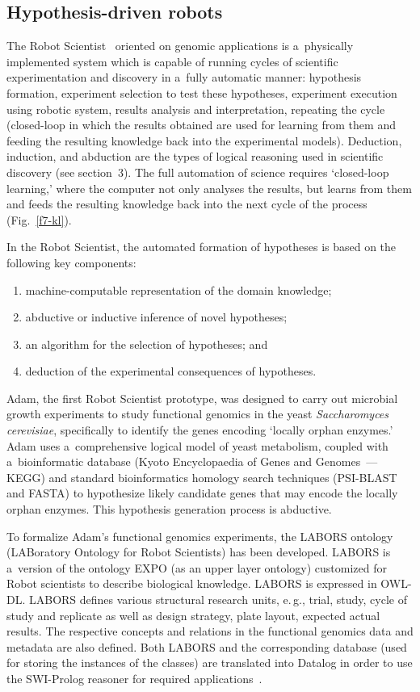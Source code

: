 \begin{multicols}{2}
\subsection{Hypothesis-driven robots}

\noindent
  The Robot Scientist~\cite{53-kl} oriented on genomic applications is a~physically
implemented system which is capable of running cycles of scientific experimentation
and discovery in a~fully automatic manner: hypothesis formation, experiment
selection to test these hypotheses, experiment execution using robotic system, results
analysis and interpretation, repeating the cycle  (closed-loop in which the results
obtained are used for learning from them and feeding the resulting knowledge back
into the experimental models). Deduction, induction, and abduction are the types of
logical reasoning used in scientific discovery (see section~3). The full automation of
science requires `closed-loop learning,' where the computer not only analyses the
results, but learns from them and feeds the resulting knowledge back into the next
cycle of the process (Fig.~\ref{f7-kl}).

  In the Robot Scientist, the automated formation of hypotheses is based on the
following key components:
  \begin{enumerate}[(1)]
\item machine-computable representation of the domain knowledge;
\item abductive or inductive inference of novel hypotheses;
\item an algorithm for the selection of hypotheses; and
\item deduction of the experimental consequences of hypotheses.
\end{enumerate}

  Adam, the first Robot Scientist prototype, was designed to carry out microbial
growth experiments to study functional genomics in the yeast \textit{Saccharomyces
cerevisiae}, specifically to identify the genes encoding `locally orphan enzymes.'
Adam uses a~comprehensive logical model of yeast metabolism, coupled with a~bioinformatic database (Kyoto Encyclopaedia of Genes and Genomes~--- KEGG)
and standard bioinformatics homology search techniques (PSI-BLAST and FASTA)
to hypothesize likely candidate genes that may encode the locally orphan enzymes.
This hypothesis generation process is abductive.

  To formalize Adam's functional genomics experiments, the LABORS ontology
(LABoratory Ontology for Robot Scientists) has been developed. LABORS is a~version of the ontology EXPO (as an upper layer ontology) customized for Robot
scientists to describe biological knowledge. LABORS is expressed in OWL-DL.
LABORS defines various structural research units, e.\,g., trial, study, cycle of study
and replicate as well as design strategy, plate layout, expected actual results. The
respective concepts and relations in the functional genomics data and metadata are
also defined. Both LABORS and the corresponding database (used for storing the
instances of the classes) are translated into Datalog in order to use the SWI-Prolog
reasoner for required applications~\cite{48-kl}.


\end{multicols}
